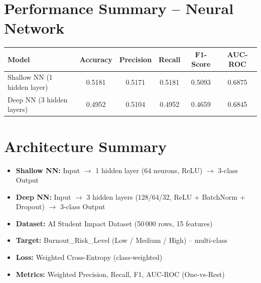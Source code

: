 \documentclass[11pt]{article}
\begin{document}
\section*{Performance Summary -- Neural Network}

\begin{center}
\begin{tabular}{lccccc}
\toprule
\textbf{Model} & \textbf{Accuracy} & \textbf{Precision} & \textbf{Recall} & \textbf{F1-Score} & \textbf{AUC-ROC} \\
\midrule
Shallow NN (1 hidden layer) & 0.5181 & 0.5171 & 0.5181 & 0.5093 & 0.6875 \\
Deep NN (3 hidden layers)   & 0.4952 & 0.5104 & 0.4952 & 0.4659 & 0.6845 \\
\bottomrule
\end{tabular}
\end{center}

\section*{Architecture Summary}

\begin{itemize}[leftmargin=*]
    \item \textbf{Shallow NN:} Input $\rightarrow$ 1 hidden layer (64 neurons, ReLU) $\rightarrow$ 3-class Output
    \item \textbf{Deep NN:} Input $\rightarrow$ 3 hidden layers (128/64/32, ReLU + BatchNorm + Dropout) $\rightarrow$ 3-class Output
    \item \textbf{Dataset:} AI Student Impact Dataset (50\,000 rows, 15 features)
    \item \textbf{Target:} Burnout\_Risk\_Level (Low / Medium / High) -- multi-class
    \item \textbf{Loss:} Weighted Cross-Entropy (class-weighted)
    \item \textbf{Metrics:} Weighted Precision, Recall, F1, AUC-ROC (One-vs-Rest)
\end{itemize}

\vfill

\end{document}
